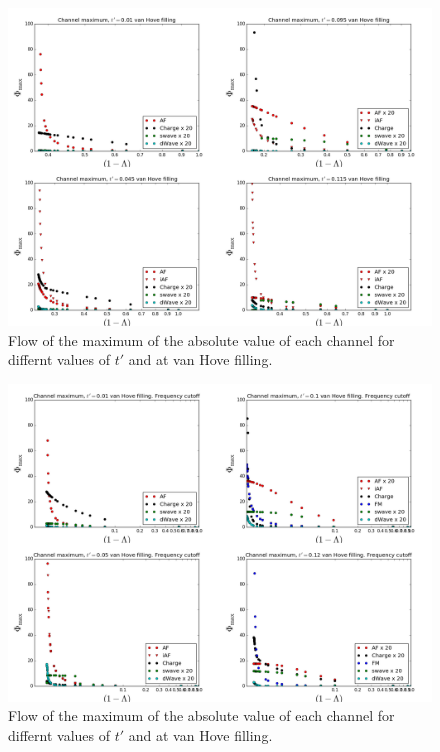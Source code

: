\begin{figure}
\includegraphics[scale=0.25]{images/vanhovelam.png}
\caption{Flow of the maximum of the absolute value of each channel for differnt values of $t'$ and at van Hove filling.
} 
\label{lamvan} 
\end{figure}

\begin{figure}
\includegraphics[scale=0.25]{images/freqvanhove.png}
\caption{Flow of the maximum of the absolute value of each channel for differnt values of $t'$ and at van Hove filling. } 
\label{freqlam} 
\end{figure}

